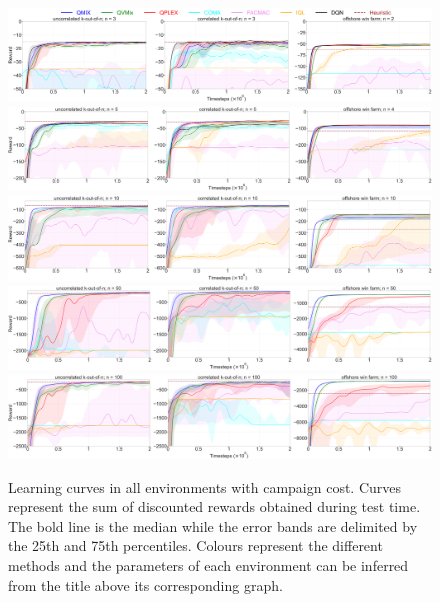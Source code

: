 \begin{figure}
\includegraphics[width=\textwidth]{tex_thesis/figures/ch5/all_3_cc_True.pdf}
\includegraphics[width=\textwidth]{tex_thesis/figures/ch5/all_5_cc_True.pdf}
\includegraphics[width=\textwidth]{tex_thesis/figures/ch5/all_10_cc_True.pdf}
\includegraphics[width=\textwidth]{tex_thesis/figures/ch5/all_50_cc_True.pdf}
\includegraphics[width=\textwidth]{tex_thesis/figures/ch5/all_100_cc_True.pdf}
\caption{
Learning curves in all environments with campaign cost. 
Curves represent the sum of discounted rewards obtained during test time.
The bold line is the median while the error bands are delimited by the 25th and 75th percentiles.
Colours represent the different methods and the parameters of each environment can be inferred from the title above its corresponding graph.
}
\label{fig:learning_curves_cc_true}
\end{figure}

